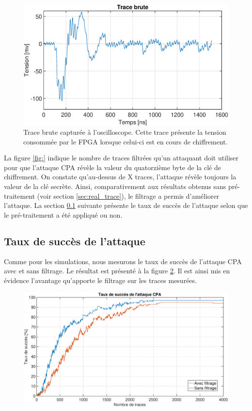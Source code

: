 \documentclass[oneside]{book}
\begin{document}
\begin{figure}[htbp]
    \hspace{-2cm}
    \includegraphics[scale=0.6]{image/trace_brute}
    \caption{Trace brute capturée à l'oscilloscope. Cette trace présente la tension consommée par le FPGA lorsque celui-ci est en cours de chiffrement.}
    \label{fig:trace_brute} 
\end{figure}

La figure \ref{fig:} indique le nombre de traces filtrées qu'un attaquant doit utiliser pour que l'attaque CPA révèle la valeur du quatorzième byte de la clé de chiffrement. On constate qu'au-dessus de X traces, l'attaque révèle toujours la valeur de la clé secrète. Ainsi, comparativement aux résultats obtenus sans pré-traitement (voir section \ref{sec:real_trace}), le filtrage a permis d'améliorer l'attaque. La section \ref{sec:success_rate} suivante présente le taux de succès de l'attaque selon que le pré-traitement a été appliqué ou non.

\subsection{Taux de succès de l'attaque}
\label{sec:success_rate}

Comme pour les simulations, nous mesurons le taux de succès de l'attaque CPA avec et sans filtrage. Le résultat est présenté à la figure \ref{fig:success_rate_real}. Il est ainsi mis en évidence l'avantage qu'apporte le filtrage sur les traces mesurées.

\begin{figure}[htbp]
    \hspace{-2cm}
    \includegraphics[scale=0.6]{image/success_rate_real}
    \caption{}
    \label{fig:success_rate_real} 
\end{figure}
\end{document}
